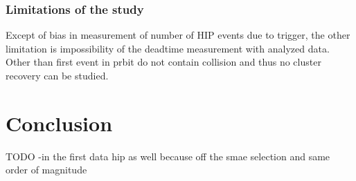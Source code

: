 \subsubsection{Limitations of the study}
 
Except of bias in measurement of number of HIP events due to trigger, the other limitation is impossibility of the deadtime measurement with analyzed data. Other than first event in prbit do not contain collision and thus no cluster recovery can be studied. 

\section{Conclusion}
TODO
-in the first data hip as well because off the smae selection and same order of magnitude




